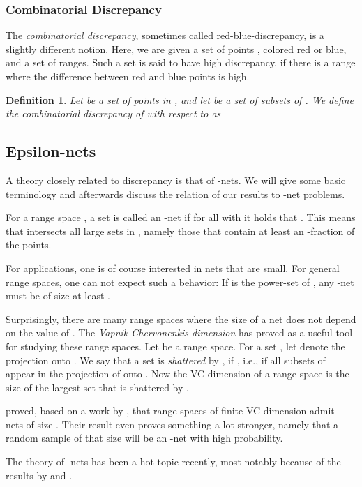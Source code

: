 \documentclass[12pt]{article}
\newtheorem{definition}{Definition}
\begin{document}
\subsubsection{Combinatorial Discrepancy}
The \emph{combinatorial discrepancy}, sometimes called red-blue-discrepancy, is a slightly different notion. Here, we are given a set of points , colored red or blue, and a set of ranges. Such a set is said to have high discrepancy, if there is a range where the difference between red and blue points is high.
\begin{definition}
Let  be a set of points in , and let  be a set of subsets of . We define the \emph{combinatorial discrepancy} of  with respect to  as

\end{definition}

\subsection{Epsilon-nets}
A theory closely related to discrepancy is that of -nets. We will give some basic terminology and afterwards discuss the relation of our results to -net problems.

For a range space , a set  is called an -net if for all  with  it holds that . This means that  intersects all large sets in , namely those that contain at least an -fraction of the points.

For applications, one is of course interested in nets that are small. For general range spaces, one can not expect such a behavior: If  is the power-set of , any -net must be of size at least .

Surprisingly, there are many range spaces where the size of a net does not depend on the value of . 
The \emph{Vapnik-Chervonenkis dimension} has proved as a useful tool for studying these range spaces. Let  be a range space. For a set , let  denote the projection onto . We say that a set  is \emph{shattered} by , if , i.e., if all subsets of  appear in the projection of  onto . Now the VC-dimension  of a range space is the size of the largest set  that is shattered by .

\cite{HW86} proved, based on a work by \cite{VC71}, that range spaces of finite VC-dimension  admit -nets of size . Their result even proves something a lot stronger, namely that a random sample of that size will be an -net with high probability.

The theory of -nets has been a hot topic recently, most notably because of the results by \cite{Al11} and \cite{PT10}.
\end{document}
